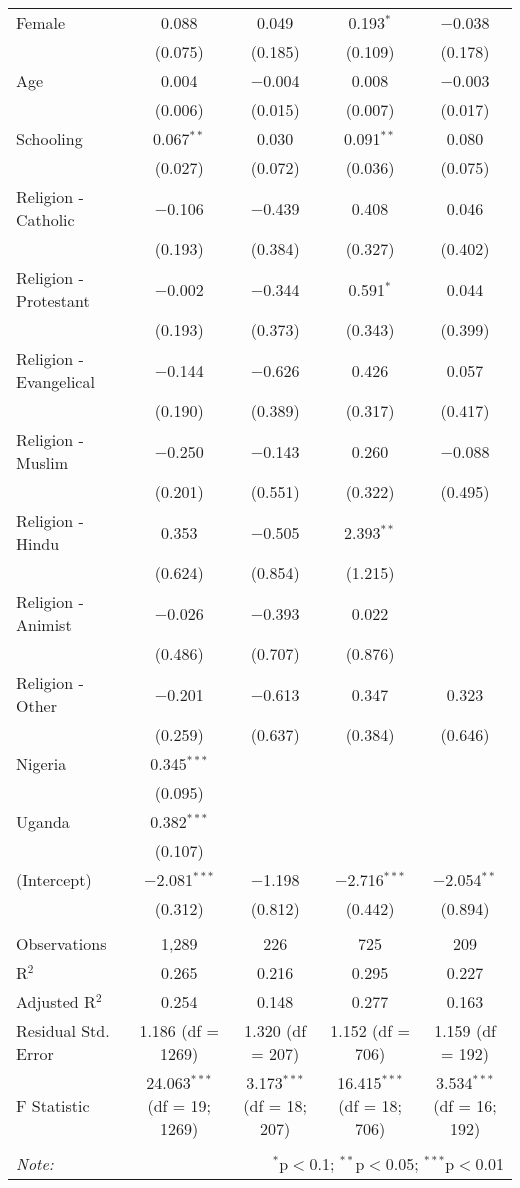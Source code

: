\begin{table}[!htbp]
\begin{tabular}{@{\extracolsep{5pt}}lcccc}
  Female & 0.088 & 0.049 & 0.193$^{*}$ & $-$0.038 \\ 
  & (0.075) & (0.185) & (0.109) & (0.178) \\ 
  Age & 0.004 & $-$0.004 & 0.008 & $-$0.003 \\ 
  & (0.006) & (0.015) & (0.007) & (0.017) \\ 
  Schooling & 0.067$^{**}$ & 0.030 & 0.091$^{**}$ & 0.080 \\ 
  & (0.027) & (0.072) & (0.036) & (0.075) \\ 
  Religion - Catholic & $-$0.106 & $-$0.439 & 0.408 & 0.046 \\ 
  & (0.193) & (0.384) & (0.327) & (0.402) \\ 
  Religion - Protestant & $-$0.002 & $-$0.344 & 0.591$^{*}$ & 0.044 \\ 
  & (0.193) & (0.373) & (0.343) & (0.399) \\ 
  Religion - Evangelical & $-$0.144 & $-$0.626 & 0.426 & 0.057 \\ 
  & (0.190) & (0.389) & (0.317) & (0.417) \\ 
  Religion - Muslim & $-$0.250 & $-$0.143 & 0.260 & $-$0.088 \\ 
  & (0.201) & (0.551) & (0.322) & (0.495) \\ 
  Religion - Hindu & 0.353 & $-$0.505 & 2.393$^{**}$ &  \\ 
  & (0.624) & (0.854) & (1.215) &  \\ 
  Religion - Animist & $-$0.026 & $-$0.393 & 0.022 &  \\ 
  & (0.486) & (0.707) & (0.876) &  \\ 
  Religion - Other & $-$0.201 & $-$0.613 & 0.347 & 0.323 \\ 
  & (0.259) & (0.637) & (0.384) & (0.646) \\ 
  Nigeria & 0.345$^{***}$ &  &  &  \\ 
  & (0.095) &  &  &  \\ 
  Uganda & 0.382$^{***}$ &  &  &  \\ 
  & (0.107) &  &  &  \\ 
  (Intercept) & $-$2.081$^{***}$ & $-$1.198 & $-$2.716$^{***}$ & $-$2.054$^{**}$ \\ 
  & (0.312) & (0.812) & (0.442) & (0.894) \\ 
 \hline \\[-1.8ex] 
Observations & 1,289 & 226 & 725 & 209 \\ 
R$^{2}$ & 0.265 & 0.216 & 0.295 & 0.227 \\ 
Adjusted R$^{2}$ & 0.254 & 0.148 & 0.277 & 0.163 \\ 
Residual Std. Error & 1.186 (df = 1269) & 1.320 (df = 207) & 1.152 (df = 706) & 1.159 (df = 192) \\ 
F Statistic & 24.063$^{***}$ (df = 19; 1269) & 3.173$^{***}$ (df = 18; 207) & 16.415$^{***}$ (df = 18; 706) & 3.534$^{***}$ (df = 16; 192) \\ 
\hline 
\hline \\[-1.8ex] 
\textit{Note:}  & \multicolumn{4}{r}{$^{*}$p$<$0.1; $^{**}$p$<$0.05; $^{***}$p$<$0.01} \\ 
\end{tabular} 
\end{table} 
